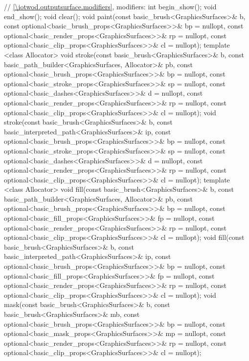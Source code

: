 \begin{codeblock}
{{    // \ref{\iotwod.outputsurface.modifiers}, modifiers:
    int begin_show();
    void end_show();
    void clear();
    void paint(const basic_brush<GraphicsSurfaces>& b,
      const optional<basic_brush_props<GraphicsSurfaces>>& bp = nullopt,
      const optional<basic_render_props<GraphicsSurfaces>>& rp = nullopt,
      const optional<basic_clip_props<GraphicsSurfaces>>& cl = nullopt);
    template <class Allocator>
    void stroke(const basic_brush<GraphicsSurfaces>& b,
      const basic_path_builder<GraphicsSurfaces, Allocator>& pb,
      const optional<basic_brush_props<GraphicsSurfaces>>& bp = nullopt,
      const optional<basic_stroke_props<GraphicsSurfaces>>& sp = nullopt,
      const optional<basic_dashes<GraphicsSurfaces>>& d = nullopt,
      const optional<basic_render_props<GraphicsSurfaces>>& rp = nullopt,
      const optional<basic_clip_props<GraphicsSurfaces>>& cl = nullopt);
    void stroke(const basic_brush<GraphicsSurfaces>& b,
      const basic_interpreted_path<GraphicsSurfaces>& ip,
      const optional<basic_brush_props<GraphicsSurfaces>>& bp = nullopt,
      const optional<basic_stroke_props<GraphicsSurfaces>>& sp = nullopt,
      const optional<basic_dashes<GraphicsSurfaces>>& d = nullopt,
      const optional<basic_render_props<GraphicsSurfaces>>& rp = nullopt,
      const optional<basic_clip_props<GraphicsSurfaces>>& cl = nullopt);
    template <class Allocator>
    void fill(const basic_brush<GraphicsSurfaces>& b,
      const basic_path_builder<GraphicsSurfaces, Allocator>& pb,
      const optional<basic_brush_props<GraphicsSurfaces>>& bp = nullopt,
      const optional<basic_fill_props<GraphicsSurfaces>>& fp = nullopt,
      const optional<basic_render_props<GraphicsSurfaces>>& rp = nullopt,
      const optional<basic_clip_props<GraphicsSurfaces>>& cl = nullopt);
    void fill(const basic_brush<GraphicsSurfaces>& b,
      const basic_interpreted_path<GraphicsSurfaces>& ip,
      const optional<basic_brush_props<GraphicsSurfaces>>& bp = nullopt,
      const optional<basic_fill_props<GraphicsSurfaces>>& fp = nullopt,
      const optional<basic_render_props<GraphicsSurfaces>>& rp = nullopt,
      const optional<basic_clip_props<GraphicsSurfaces>>& cl = nullopt);
    void mask(const basic_brush<GraphicsSurfaces>& b,
      const basic_brush<GraphicsSurfaces>& mb,
      const optional<basic_brush_props<GraphicsSurfaces>>& bp = nullopt,
      const optional<basic_mask_props<GraphicsSurfaces>>& mp = nullopt,
      const optional<basic_render_props<GraphicsSurfaces>>& rp = nullopt,
      const optional<basic_clip_props<GraphicsSurfaces>>& cl = nullopt);
}}
\end{codeblock}
